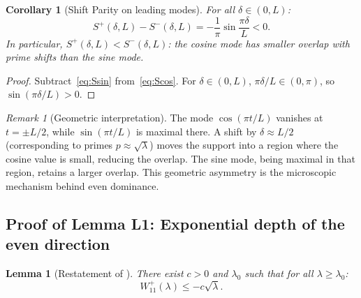 \documentclass[12pt,a4paper]{article}
\newtheorem{lemma}[theorem]{Lemma}
\newtheorem{corollary}[theorem]{Corollary}
\theoremstyle{definition}
\theoremstyle{remark}
\newtheorem{remark}[theorem]{Remark}
\begin{document}
\begin{corollary}[Shift Parity on leading modes]
\label{cor:diagonal-parity}
For all $\delta \in (0, L)$:
\begin{equation}
\label{eq:parity-diff}
  S^+(\delta, L) - S^-(\delta, L) = -\frac{1}{\pi}\sin\frac{\pi\delta}{L} < 0.
\end{equation}
In particular, $S^+(\delta, L) < S^-(\delta, L)$: the cosine mode has \emph{smaller} overlap with prime shifts than the sine mode.
\end{corollary}

\begin{proof}
Subtract~\eqref{eq:Ssin} from~\eqref{eq:Scos}. For $\delta \in (0, L)$, $\pi\delta/L \in (0, \pi)$, so $\sin(\pi\delta/L) > 0$.
\end{proof}

\begin{remark}[Geometric interpretation]
The mode $\cos(\pi t/L)$ vanishes at $t = \pm L/2$, while $\sin(\pi t/L)$ is maximal there. A shift by $\delta \approx L/2$ (corresponding to primes $p \approx \sqrt{\lambda}$) moves the support into a region where the cosine value is small, reducing the overlap. The sine mode, being maximal in that region, retains a larger overlap. This geometric asymmetry is the microscopic mechanism behind even dominance.
\end{remark}

\subsection{Proof of Lemma L1: Exponential depth of the even direction}

\begin{lemma}[Restatement of ]
There exist $c > 0$ and $\lambda_0$ such that for all $\lambda \geq \lambda_0$:
\[
  W_{11}^+(\lambda) \leq -c\sqrt{\lambda}.
\]
\end{lemma}
\end{document}
